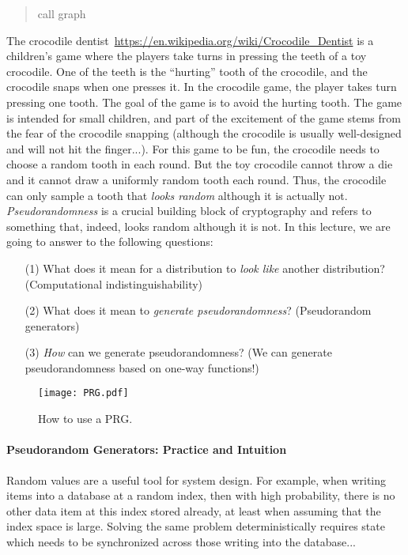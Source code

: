 \documentclass[a4paper,table,dvipsnames]{article}
\theoremstyle{definition}
\begin{document}
\begin{quote}
call graph
\end{quote}
\fi


\iffalse
The crocodile dentist~\url{https://en.wikipedia.org/wiki/Crocodile_Dentist} is a children's game where the players take turns in pressing the teeth of a toy crocodile. One of the teeth is the ``hurting'' tooth of the crocodile, and the crocodile snaps when one presses it. In the crocodile game, the player takes turn pressing one tooth. The goal of the game is to avoid the hurting tooth. The game is intended for small children, and part of the excitement of the game stems from the fear of the crocodile snapping (although the crocodile is usually well-designed and will not hit the finger...). For this game to be fun, the crocodile needs to choose a random tooth in each round. But the toy crocodile cannot throw a die and it cannot draw a uniformly random tooth each round.
Thus, the crocodile can only sample a tooth that \emph{looks random} although it is actually not.
\emph{Pseudorandomness} is a crucial building block of cryptography and refers to something that,
indeed, looks random although it is not. In this lecture, we are going to answer to the following
questions:
\begin{itemize}
\item[(1)] What does it mean for a distribution to \emph{look like} another distribution? (Computational indistinguishability)
\item[(2)] What does it mean to \emph{generate pseudorandomness}? (Pseudorandom generators)
\item[(3)] \emph{How} can we generate pseudorandomness? (We can generate pseudorandomness based on one-way functions!)
\end{itemize}


\begin{wrapfigure}{R}{0.5\textwidth}
\vspace{-0.3cm}
\begin{center}
\texttt{[image: PRG.pdf]}
\end{center}
\caption{How to use a PRG.}
\label{fig:prguse}
\vspace{-0.3cm}
\end{wrapfigure}

\paragraph{Pseudorandom Generators: Practice and Intuition}
Random values are a useful tool for system design. For example, when writing
items into a database at a random index, then with high probability, there is
no other data item at this index stored already, at least when assuming that 
the index space is large. Solving the same problem deterministically requires
state which needs to be synchronized across those writing into the database...
\end{document}
